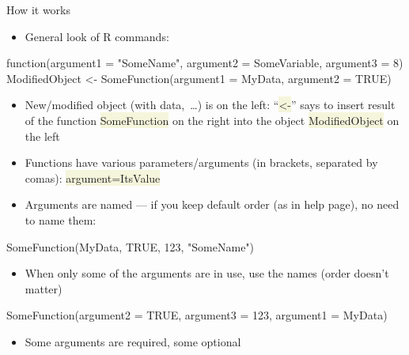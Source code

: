 \documentclass[compress, xelatex, 11pt, xcolor=svgnames, aspectratio=169, url={hyphens, lowtilde}]{beamer}
\renewcommand{\texttt}[1]{\colorbox{Beige}{{\ttfamily #1}}}
\begin{document}
\begin{frame}[fragile]{How it works}
	\begin{itemize}
		\item General look of R commands:
	\end{itemize}
	\begin{spluscode}
    function(argument1 = "SomeName", argument2 = SomeVariable, argument3 = 8)
    ModifiedObject <- SomeFunction(argument1 = MyData, argument2 = TRUE)
	\end{spluscode}
	\begin{itemize}
		\item New/modified object (with data,~\ldots) is on the left: \enquote{\texttt{<-}} says to insert result of the function \texttt{SomeFunction} on the right into the object \texttt{ModifiedObject} on the left
		\item Functions have various parameters/arguments (in brackets, separated by comas): \texttt{argument=ItsValue}
		\item Arguments are named --- if you keep default order (as in help page), no need to name them:
	\end{itemize}
	\begin{spluscode}
    SomeFunction(MyData, TRUE, 123, "SomeName")
	\end{spluscode}
	\begin{itemize}
		\item When only some of the arguments are in use, use the names (order doesn't matter)
	\end{itemize}
	\begin{spluscode}
    SomeFunction(argument2 = TRUE, argument3 = 123, argument1 = MyData)
	\end{spluscode}
	\begin{itemize}
		\item Some arguments are required, some optional
	\end{itemize}
\end{frame}
\end{document}
